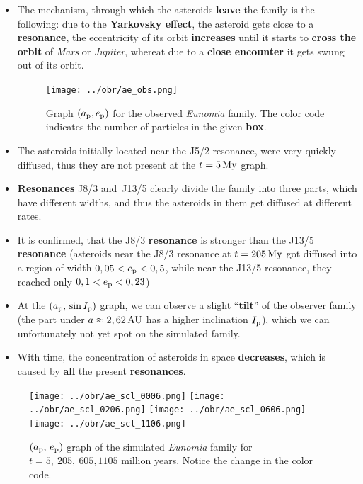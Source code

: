 \documentclass{beamer}
\newlength{\vyska}
\newlength{\vyskaB}
\newlength{\main}
\begin{document}
\begin{frame}
\begin{columns}[t]
\begin{column}{\main}
\begin{tcolorbox}[title=Simulation of orbital evolution\vphantom{Úy},height=0.75\vyskaB]
\begin{multicols}{2}
\begin{itemize}
\item The mechanism, through which the asteroids \textbf{leave} the family is the following: due to the \textbf{Yarkovsky effect}, the asteroid gets close to a \textbf{resonance}, the eccentricity of its orbit \textbf{increases} until it starts to \textbf{cross the orbit} of \textit{Mars} or \textit{Jupiter}, whereat due to a \textbf{close encounter} it gets swung out of its orbit.

\vspace{1cm}
	\begin{figure}
		\centering
		\texttt{[image: ../obr/ae\_obs.png]}
		\caption{Graph $(a_{\rm p}, e_{\rm p})$ for the observed \textit{Eunomia} family. The color code indicates the number of particles in the given \textbf{box}.}
	\end{figure}
\vfill\null\columnbreak

\item The asteroids initially located near the J5/2 resonance, were very quickly diffused, thus they are not present at the $t=5\,{\rm My}$ graph.

\item \textbf{Resonances} J8/3 and~J13/5 clearly divide the family into three parts, which have different widths, and thus the asteroids in them get diffused at different rates.

\item It is confirmed, that the J8/3 \textbf{resonance} is stronger than the J13/5 \textbf{resonance} (asteroids near the J8/3 resonance at $t=205\,{\rm My}$  got diffused into a region of width $0,05<e_{\rm p}<0,5$, while near the J13/5 resonance, they reached only $0,1<e_{\rm p}<0,23$)

\item At the $(a_{\rm p},\,\sin I_{\rm p})$ graph, we can observe a slight \enquote{\textbf{tilt}} of the observer family (the part under $a\approx2,62\,{\rm AU}$ has a higher inclination $I_{\rm p}$), which we can unfortunately not yet spot on the simulated family.

\item With time, the concentration of asteroids in space \textbf{decreases}, which is caused by \textbf{all} the present \textbf{resonances}.

\end{itemize}
\end{multicols}

\vspace{-1cm}

	\begin{figure}
		\centering
		\texttt{[image: ../obr/ae\_scl\_0006.png]}
		\texttt{[image: ../obr/ae\_scl\_0206.png]}
		\texttt{[image: ../obr/ae\_scl\_0606.png]}
		\texttt{[image: ../obr/ae\_scl\_1106.png]}
		\captionsetup{width=.88\linewidth}
		\caption{$(a_{\rm p},\,e_{\rm p})$ graph of the simulated \textit{Eunomia} family for $t=5,\ 205,\ 605, 1105$ million years. Notice the change in the color code.} 


\end{figure}
\end{tcolorbox}
\end{column}
\end{columns}
\end{frame}
\end{document}
